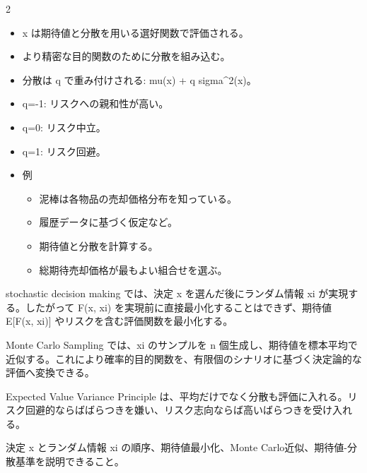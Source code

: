 \clearpage



\vspace{1.5mm}

\begin{multicols}{2}

\footnotesize

\raggedcolumns


\begin{itemize}
\item x は期待値と分散を用いる選好関数で評価される。
\item より精密な目的関数のために分散を組み込む。
\item 分散は q で重み付けされる: mu(x) + q sigma\textasciicircum{}2(x)。
\item q=-1: リスクへの親和性が高い。
\item q=0: リスク中立。
\item q=1: リスク回避。
\item 例
\begin{itemize}
\item 泥棒は各物品の売却価格分布を知っている。
\item 履歴データに基づく仮定など。
\item 期待値と分散を計算する。
\item 総期待売却価格が最もよい組合せを選ぶ。
\end{itemize}
\end{itemize}

stochastic decision making では、決定 x を選んだ後にランダム情報 xi が実現する。したがって F(x, xi) を実現前に直接最小化することはできず、期待値 E[F(x, xi)] やリスクを含む評価関数を最小化する。\par

Monte Carlo Sampling では、xi のサンプルを n 個生成し、期待値を標本平均で近似する。これにより確率的目的関数を、有限個のシナリオに基づく決定論的な評価へ変換できる。\par

Expected Value Variance Principle は、平均だけでなく分散も評価に入れる。リスク回避的ならばばらつきを嫌い、リスク志向ならば高いばらつきを受け入れる。\par

決定 x とランダム情報 xi の順序、期待値最小化、Monte Carlo近似、期待値-分散基準を説明できること。\par


\end{multicols}
